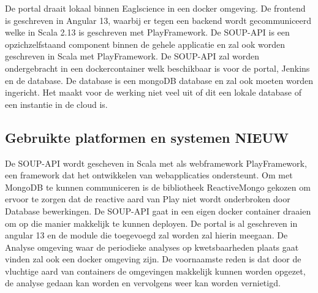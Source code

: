 De portal draait lokaal binnen Eaglscience in een docker omgeving. De frontend is geschreven in Angular 13, waarbij er tegen een backend wordt gecommuniceerd welke in Scala 2.13 is geschreven met PlayFramework. De SOUP-API is een opzichzelfstaand component binnen de gehele applicatie en zal ook worden geschreven in Scala met PlayFramework. De SOUP-API zal worden ondergebracht in een dockercontainer welk beschikbaar is voor de portal, Jenkins en de database. De database is een mongoDB database en zal ook moeten worden ingericht. Het maakt voor de werking niet veel uit of dit een lokale database of een instantie in de cloud is.

\subsection{Gebruikte platformen en systemen NIEUW}
De SOUP-API wordt gescheven in Scala met als webframework PlayFramework, een framework dat het ontwikkelen van webapplicaties ondersteunt. Om met MongoDB te kunnen communiceren is de bibliotheek ReactiveMongo gekozen om ervoor te zorgen dat de reactive aard van Play niet wordt onderbroken door Database bewerkingen. De SOUP-API gaat in een eigen docker container draaien om op die manier makkelijk te kunnen deployen. De portal is al geschreven in angular 13 en de module die toegevoegd zal worden zal hierin meegaan.
De Analyse omgeving waar de periodieke analyses op kwetsbaarheden plaats gaat vinden zal ook  een docker omgeving zijn. De voornaamste reden is dat door de vluchtige aard van containers de omgevingen makkelijk kunnen worden opgezet, de analyse gedaan kan worden en vervolgens weer kan worden vernietigd.

